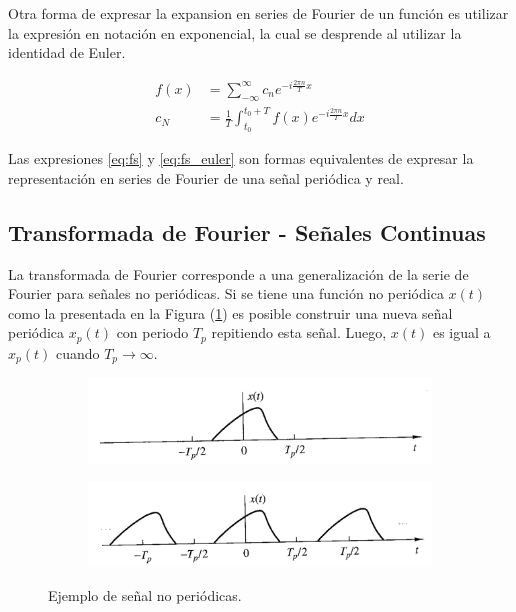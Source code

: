 \documentclass[
  letterpaper,
  twocolumn,
  9pt,
  journal,
  final]{IEEEtran}
\begin{document}
Otra forma de expresar la expansion en series de Fourier de un función es utilizar la expresión en notación en exponencial, la cual se desprende al utilizar la identidad de Euler.

\begin{align}
	f(x) &= \sum_{-\infty}^{\infty} c_n e ^ {-i \frac{2\pi n}{T} x} \label{eq:fs_euler}\\
	c_N &= \frac{1}{T} \int_{t_0}^{t_0 + T} f(x) e ^ {-i \frac{2\pi n}{T} x} dx
\end{align}

Las expresiones \ref{eq:fs} y \ref{eq:fs_euler} son formas equivalentes de expresar la representación en series de Fourier de una señal periódica y real.

\subsection{Transformada de Fourier - Señales Continuas}

La transformada de Fourier corresponde a una generalización de la serie de Fourier para señales no periódicas.
Si se tiene una función no periódica $x(t)$ como la presentada en la Figura (\ref{fig:senal_aperidica}) es posible construir una nueva señal periódica $x_p(t)$ con periodo $T_p$ repitiendo esta señal. Luego, $x(t)$ es igual a $x_p(t)$ cuando $T_p \to \infty$.

\begin{figure}[h!]
\centering
	\begin{subfigure}[b]{\columnwidth}
	\includegraphics[width=1\linewidth, angle=-1]{imgs/proakis_aperiodic_1.png}
	\label{fig:senal_aperidica}
	\end{subfigure}

	\begin{subfigure}[b]{\columnwidth}
	\includegraphics[width=1\linewidth, angle=-1]{imgs/proakis_aperiodic_2.png}
	\label{fig:senal_aperidocia_repetida}
	\end{subfigure}

\caption{Ejemplo de señal no periódicas\cite{proakis}.}
\label{fig:p4_both}
\end{figure}
\end{document}
